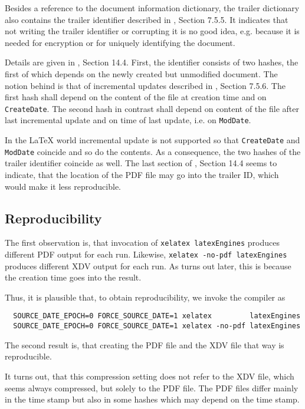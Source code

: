 \documentclass[a4paper, english]{article}%
\begin{document}
Besides a reference to the document information dictionary, 
the trailer dictionary also contains the trailer identifier 
described in \cite{Pdf20}, Section 7.5.5. 
It indicates that not writing the trailer identifier or corrupting it is no good idea, 
e.g. because it is needed for encryption or for uniquely identifying the document. 

Details are given in \cite{Pdf20}, Section 14.4. 
First, the identifier consists of two hashes, 
the first of which depends on the newly created but unmodified document. 
The notion behind is that of incremental updates described in \cite{Pdf20}, Section 7.5.6. 
The first hash shall depend on the content of the file 
at creation time and on \texttt{CreateDate}. 
The second hash in contrast shall depend on content of the file after last incremental update 
and on time of last update, i.e. on \texttt{ModDate}. 

In the \LaTeX{} world incremental update is not supported 
so that \texttt{CreateDate} and \texttt{ModDate} coincide 
and so do the contents. 
As a consequence, the two hashes of the trailer identifier coincide as well. 
The last section of \cite{Pdf20}, Section 14.4 seems to indicate, 
that the location of the PDF file may go into the trailer ID, 
which would make it less reproducible. 


\subsection{Reproducibility}\label{subsec:reprod}

The first observation is, that invocation of \texttt{xelatex latexEngines} 
produces different PDF output for each run. 
Likewise, \texttt{xelatex -no-pdf latexEngines} produces different XDV output for each run. 
As turns out later, this is because the creation time goes into the result. 

Thus, it is plausible that, to obtain reproducibility, we invoke the compiler as 
%
\begin{verbatim}
  SOURCE_DATE_EPOCH=0 FORCE_SOURCE_DATE=1 xelatex         latexEngines
  SOURCE_DATE_EPOCH=0 FORCE_SOURCE_DATE=1 xelatex -no-pdf latexEngines
\end{verbatim}

The second result is, that creating the PDF file and the XDV file that way is reproducible. 




It turns out, that this compression setting does not refer to the XDV file, 
which seems always compressed, but solely to the PDF file. 
The PDF files differ mainly in the time stamp 
but also in some hashes which may depend on the time stamp. 
\end{document}
